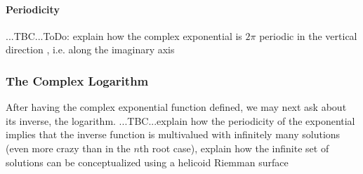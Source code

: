 
\paragraph{Periodicity} ...TBC...ToDo: explain how the complex exponential is $2 \pi$ periodic in the vertical direction , i.e. along the imaginary axis



\subsubsection{The Complex Logarithm}
After having the complex exponential function defined, we may next ask about its inverse, the logarithm. ...TBC...explain how the periodicity of the exponential implies that the inverse function is multivalued with infinitely many solutions (even more crazy than in the $n$th root case), explain how the infinite set of solutions can be conceptualized using a helicoid Riemman surface




